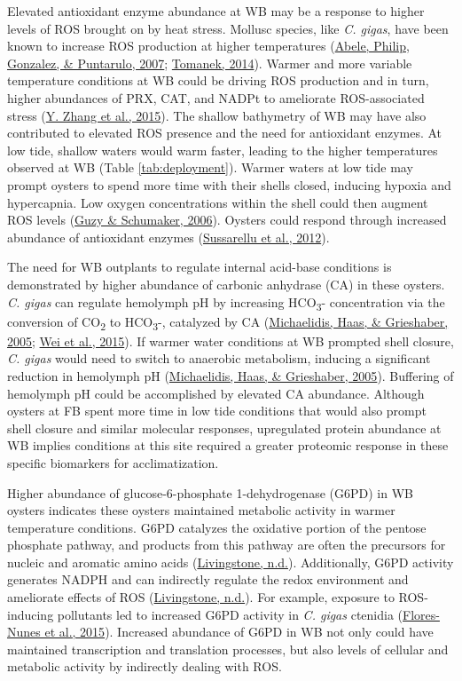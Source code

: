 \documentclass [11pt, proquest] {uwthesis}[2015/03/03]
\begin{document}
Elevated antioxidant enzyme abundance at WB may be a response to higher levels of ROS brought on by heat stress. Mollusc species, like \emph{C. gigas}, have been known to increase ROS production at higher temperatures (\protect\hyperlink{ref-Abele2007}{Abele, Philip, Gonzalez, \& Puntarulo, 2007}; \protect\hyperlink{ref-Tomanek2014}{Tomanek, 2014}). Warmer and more variable temperature conditions at WB could be driving ROS production and in turn, higher abundances of PRX, CAT, and NADPt to ameliorate ROS-associated stress (\protect\hyperlink{ref-Zhang2015}{Y. Zhang et al., 2015}). The shallow bathymetry of WB may have also contributed to elevated ROS presence and the need for antioxidant enzymes. At low tide, shallow waters would warm faster, leading to the higher temperatures observed at WB (Table \ref{tab:deployment}). Warmer waters at low tide may prompt oysters to spend more time with their shells closed, inducing hypoxia and hypercapnia. Low oxygen concentrations within the shell could then augment ROS levels (\protect\hyperlink{ref-Guzy2006}{Guzy \& Schumaker, 2006}). Oysters could respond through increased abundance of antioxidant enzymes (\protect\hyperlink{ref-Sussarellu2012}{Sussarellu et al., 2012}).

The need for WB outplants to regulate internal acid-base conditions is demonstrated by higher abundance of carbonic anhydrase (CA) in these oysters. \emph{C. gigas} can regulate hemolymph pH by increasing HCO\textsubscript{3}- concentration via the conversion of CO\textsubscript{2} to HCO\textsubscript{3}-, catalyzed by CA (\protect\hyperlink{ref-Michaelidis2005}{Michaelidis, Haas, \& Grieshaber, 2005}; \protect\hyperlink{ref-Wei2015}{Wei et al., 2015}). If warmer water conditions at WB prompted shell closure, \emph{C. gigas} would need to switch to anaerobic metabolism, inducing a significant reduction in hemolymph pH (\protect\hyperlink{ref-Michaelidis2005}{Michaelidis, Haas, \& Grieshaber, 2005}). Buffering of hemolymph pH could be accomplished by elevated CA abundance. Although oysters at FB spent more time in low tide conditions that would also prompt shell closure and similar molecular responses, upregulated protein abundance at WB implies conditions at this site required a greater proteomic response in these specific biomarkers for acclimatization.

Higher abundance of glucose-6-phosphate 1-dehydrogenase (G6PD) in WB oysters indicates these oysters maintained metabolic activity in warmer temperature conditions. G6PD catalyzes the oxidative portion of the pentose phosphate pathway, and products from this pathway are often the precursors for nucleic and aromatic amino acids (\protect\hyperlink{ref-Livingstone1981}{Livingstone, n.d.}). Additionally, G6PD activity generates NADPH and can indirectly regulate the redox environment and ameliorate effects of ROS (\protect\hyperlink{ref-Livingstone1981}{Livingstone, n.d.}). For example, exposure to ROS-inducing pollutants led to increased G6PD activity in \emph{C. gigas} ctenidia (\protect\hyperlink{ref-Flores-Nunes2015}{Flores-Nunes et al., 2015}). Increased abundance of G6PD in WB not only could have maintained transcription and translation processes, but also levels of cellular and metabolic activity by indirectly dealing with ROS.
\end{document}
